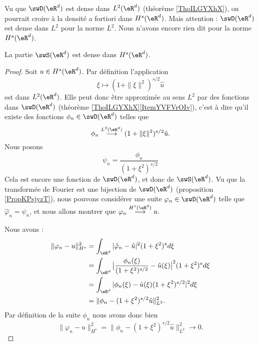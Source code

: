 \begin{normaltext}
    Vu que \( \swD(\eR^d)\) est dense dans \( L^2(\eR^d)\) (théorème \ref{ThoILGYXhX}), on pourrait croire à la densité a fortiori dans \( H^s(\eR^d)\). Mais attention : \( \swD(\eR^d)\) est dense dans \( L^2\) pour la norme \( L^2\). Nous n'avons encore rien dit pour la norme \( H^s(\eR^d)\).
\end{normaltext}

\begin{proposition}      \label{PROPooMKAFooKDNTbO}
    La partie \( \swS(\eR^d)\) est dense dans \( H^s(\eR^d)\).
\end{proposition}

\begin{proof}
    Soit $u\in H^s(\eR^d)$. Par définition l'application
    \begin{equation}
        \xi\mapsto (1+\| \xi \|^2)^{s/2}\hat u
    \end{equation}
    est dans \( L^2(\eR^d)\). Elle peut donc être approximée au sens \( L^2\) par des fonctions dans \( \swD(\eR^d)\) (théorème \ref{ThoILGYXhX}\ref{ItemYVFVrOIv}), c'est à dire qu'il existe des fonctions \( \phi_n\in\swD(\eR^d)\) telles que
    \begin{equation}
        \phi_n\stackrel{L^2(\eR^d)}{\longrightarrow}(1+\| \xi \|^2)^{s/2}\hat u.
    \end{equation}
    Nous posons
    \begin{equation}
        \psi_n=\frac{ \phi_n }{ (1+\xi^2)^{s/2} }
    \end{equation}
    Cela est encore une fonction de \( \swD(\eR^d)\), et donc de \( \swS(\eR^d)\). Vu que la transformée de Fourier est une bijection de \( \swD(\eR^d)\) (proposition \ref{PropKPsjyzT}), nous pouvons considérer une suite \( \varphi_n\in\swD(\eR^d)\) telle que \( \hat \varphi_n=\psi_n \), et nous allons montrer que \( \varphi_n\stackrel{H^s(\eR^d)}{\longrightarrow}u\).

    Nous avons :
    \begin{subequations}
        \begin{align}
            \| \varphi_n-u \|^2_{H^s}&=\int_{\eR^d}| \hat \varphi_n-\hat u |^2(1+\xi^2)^sd\xi\\
            &=\int_{\eR^d}\big| \frac{ \phi_n(\xi) }{ (1+\xi^2)^{s/2} }-\hat u(\xi) \big|^2(1+\xi^2)^sd\xi\\
            &=\int_{\eR^d}| \phi_n(\xi)-\hat u(\xi)(1+\xi^2)^{s/2} |^2d\xi\\
            &=\| \phi_n-(1+\xi^2)^{s/2}\hat u \|^2_{L^2}.
        \end{align}
    \end{subequations}
    Par définition de la suite \( \phi_n\) nous avons donc bien 
    \begin{equation}
            \| \varphi_n-u \|^2_{H^s} =\| \phi_n-(1+\xi^2)^{s/2}\hat u \|^2_{L^2}\to 0.
    \end{equation}


\end{proof}
